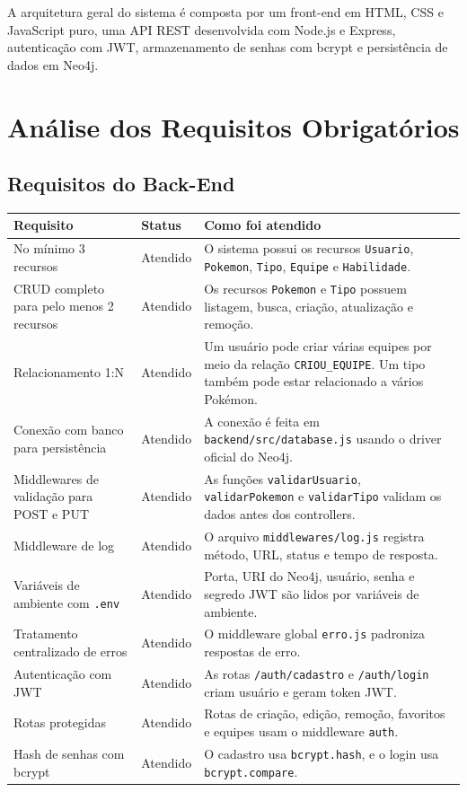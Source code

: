 \documentclass[12pt,a4paper]{article}
\begin{document}
A arquitetura geral do sistema é composta por um front-end em HTML, CSS e JavaScript puro, uma API REST desenvolvida com Node.js e Express, autenticação com JWT, armazenamento de senhas com bcrypt e persistência de dados em Neo4j.

\section{Análise dos Requisitos Obrigatórios}

\subsection{Requisitos do Back-End}

\begin{longtable}{p{4.4cm}p{2.2cm}p{7.2cm}}
\toprule
\textbf{Requisito} & \textbf{Status} & \textbf{Como foi atendido}\\
\midrule
\endhead
No mínimo 3 recursos & Atendido & O sistema possui os recursos \texttt{Usuario}, \texttt{Pokemon}, \texttt{Tipo}, \texttt{Equipe} e \texttt{Habilidade}.\\
CRUD completo para pelo menos 2 recursos & Atendido & Os recursos \texttt{Pokemon} e \texttt{Tipo} possuem listagem, busca, criação, atualização e remoção.\\
Relacionamento 1:N & Atendido & Um usuário pode criar várias equipes por meio da relação \texttt{CRIOU\_EQUIPE}. Um tipo também pode estar relacionado a vários Pokémon.\\
Conexão com banco para persistência & Atendido & A conexão é feita em \texttt{backend/src/database.js} usando o driver oficial do Neo4j.\\
Middlewares de validação para POST e PUT & Atendido & As funções \texttt{validarUsuario}, \texttt{validarPokemon} e \texttt{validarTipo} validam os dados antes dos controllers.\\
Middleware de log & Atendido & O arquivo \texttt{middlewares/log.js} registra método, URL, status e tempo de resposta.\\
Variáveis de ambiente com \texttt{.env} & Atendido & Porta, URI do Neo4j, usuário, senha e segredo JWT são lidos por variáveis de ambiente.\\
Tratamento centralizado de erros & Atendido & O middleware global \texttt{erro.js} padroniza respostas de erro.\\
Autenticação com JWT & Atendido & As rotas \texttt{/auth/cadastro} e \texttt{/auth/login} criam usuário e geram token JWT.\\
Rotas protegidas & Atendido & Rotas de criação, edição, remoção, favoritos e equipes usam o middleware \texttt{auth}.\\
Hash de senhas com bcrypt & Atendido & O cadastro usa \texttt{bcrypt.hash}, e o login usa \texttt{bcrypt.compare}.\\
\bottomrule
\end{longtable}
\end{document}
